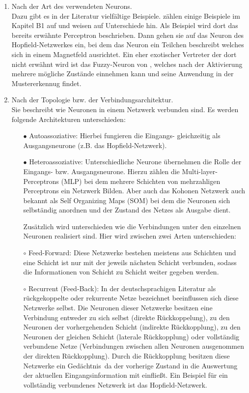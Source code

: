 \begin{enumerate}
\item%
Nach der Art des verwendeten Neurons.\\
Dazu gibt es in der Literatur vielfältige Beispiele. \citet{Fiesler96} zählen einige Beispiele im Kapitel B1 auf und weisen auf Unterschiede hin. Als Beispiel wird dort das bereits erwähnte Perceptron beschrieben. Dann gehen sie auf das Neuron des Hopfield-Netzwerkes ein, bei dem das Neuron ein Teilchen beschreibt welches sich in einem Magnetfeld ausrichtet. Ein eher exotischer Vertreter der dort nicht erwähnt wird ist das Fuzzy-Neuron von \citet{fuzzy-neuron}, welches nach der Aktivierung mehrere mögliche Zustände einnehmen kann und seine Anwendung in der Mustererkennug findet.

\item%
Nach der Topologie bzw. der Verbindungsarchitektur.\\
Sie beschreibt wie Neuronen in einem Netzwerk verbunden sind.
Es werden folgende Architekturen unterschieden:
\begin{itemize}
\item[\textbf{$\bullet$}]%
Autoassoziative: Hierbei fungieren die Eingangs- gleichzeitig als Ausgangsneurone (z.B. das Hopfield-Netzwerk). 

\item[\textbf{$\bullet$}]%
Heteroassoziative: Unterschiedliche Neurone übernehmen die Rolle der Eingangs- bzw. Ausgangsneurone. Hierzu zählen die Multi-layer-Perceptrons (MLP) bei dem mehrere Schichten von mehrzahligen Perceptrons ein Netzwerk Bilden. Aber auch das Kohonen Netzwerk auch bekannt als Self Organizing Maps (SOM) bei dem die Neuronen sich selbständig anordnen und der Zustand des Netzes als Ausgabe dient.

Zusätzlich wird unterschieden wie die Verbindungen unter den einzelnen Neuronen realisiert sind. Hier wird zwischen zwei Arten unterschieden:

\item[$\circ$]%
Feed-Forward: Diese Netzwerke bestehen meistens aus Schichten und eine Schicht ist nur mit der jeweils nächsten Schicht verbunden, sodass die Informationen von Schicht zu Schicht weiter gegeben werden.

\item[$\circ$]%
Recurrent (Feed-Back): In der deutschsprachigen Literatur als rückgekoppelte oder rekurrente Netze bezeichnet beeinflussen sich diese Netzwerke selbst. Die Neuronen dieser Netzwerke besitzen eine Verbindung entweder zu sich selbst (direkte Rückkoppelung), zu den Neuronen der vorhergehenden Schicht (indirekte Rückkopplung), zu den Neuronen der gleichen Schicht (laterale Rückkopplung) oder vollständig verbundene Netze (Verbindungen zwischen allen Neuronen ausgenommen der direkten Rückkopplung). Durch die Rückkopplung besitzen diese Netzwerke ein \glqq Gedächtnis\grqq~da der vorherige Zustand in die Auswertung der aktuellen Eingangsinformation mit einfließt. Ein Beispiel für ein vollständig verbundenes Netzwerk ist das Hopfield-Netzwerk.


\end{itemize}
\end{enumerate}
